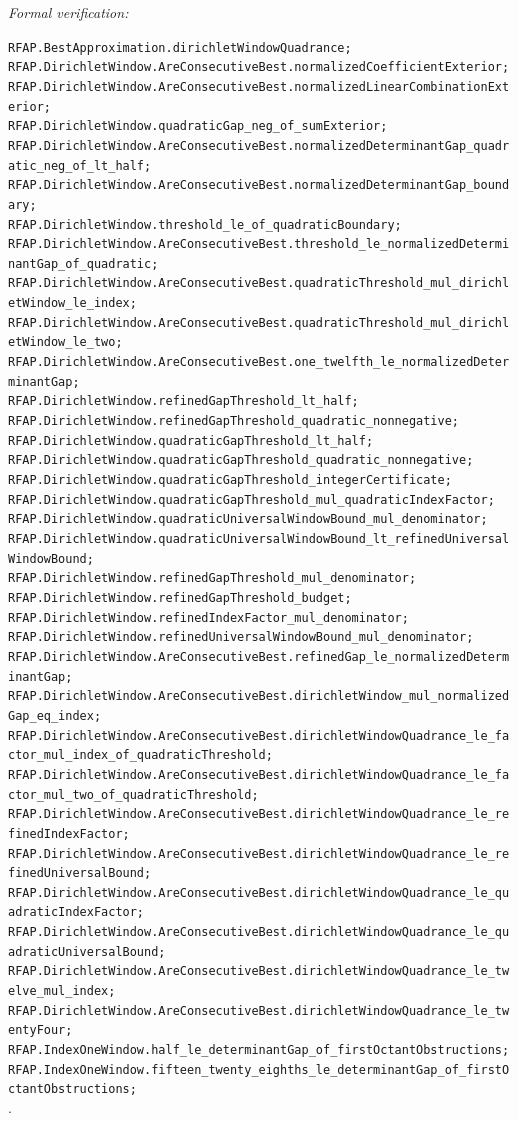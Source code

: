 \documentclass[11pt]{article}
\newcommand{\leanref}[1]{\par\smallskip\noindent
  \emph{Formal verification:}\par\nobreak
  {\raggedright\nolinkurl{#1}.\par}}
\begin{document}
\leanref{RFAP.BestApproximation.dirichletWindowQuadrance;
RFAP.DirichletWindow.AreConsecutiveBest.normalizedCoefficientExterior;
RFAP.DirichletWindow.AreConsecutiveBest.normalizedLinearCombinationExterior;
RFAP.DirichletWindow.quadraticGap_neg_of_sumExterior;
RFAP.DirichletWindow.AreConsecutiveBest.normalizedDeterminantGap_quadratic_neg_of_lt_half;
RFAP.DirichletWindow.AreConsecutiveBest.normalizedDeterminantGap_boundary;
RFAP.DirichletWindow.threshold_le_of_quadraticBoundary;
RFAP.DirichletWindow.AreConsecutiveBest.threshold_le_normalizedDeterminantGap_of_quadratic;
RFAP.DirichletWindow.AreConsecutiveBest.quadraticThreshold_mul_dirichletWindow_le_index;
RFAP.DirichletWindow.AreConsecutiveBest.quadraticThreshold_mul_dirichletWindow_le_two;
RFAP.DirichletWindow.AreConsecutiveBest.one_twelfth_le_normalizedDeterminantGap;
RFAP.DirichletWindow.refinedGapThreshold_lt_half;
RFAP.DirichletWindow.refinedGapThreshold_quadratic_nonnegative;
RFAP.DirichletWindow.quadraticGapThreshold_lt_half;
RFAP.DirichletWindow.quadraticGapThreshold_quadratic_nonnegative;
RFAP.DirichletWindow.quadraticGapThreshold_integerCertificate;
RFAP.DirichletWindow.quadraticGapThreshold_mul_quadraticIndexFactor;
RFAP.DirichletWindow.quadraticUniversalWindowBound_mul_denominator;
RFAP.DirichletWindow.quadraticUniversalWindowBound_lt_refinedUniversalWindowBound;
RFAP.DirichletWindow.refinedGapThreshold_mul_denominator;
RFAP.DirichletWindow.refinedGapThreshold_budget;
RFAP.DirichletWindow.refinedIndexFactor_mul_denominator;
RFAP.DirichletWindow.refinedUniversalWindowBound_mul_denominator;
RFAP.DirichletWindow.AreConsecutiveBest.refinedGap_le_normalizedDeterminantGap;
RFAP.DirichletWindow.AreConsecutiveBest.dirichletWindow_mul_normalizedGap_eq_index;
RFAP.DirichletWindow.AreConsecutiveBest.dirichletWindowQuadrance_le_factor_mul_index_of_quadraticThreshold;
RFAP.DirichletWindow.AreConsecutiveBest.dirichletWindowQuadrance_le_factor_mul_two_of_quadraticThreshold;
RFAP.DirichletWindow.AreConsecutiveBest.dirichletWindowQuadrance_le_refinedIndexFactor;
RFAP.DirichletWindow.AreConsecutiveBest.dirichletWindowQuadrance_le_refinedUniversalBound;
RFAP.DirichletWindow.AreConsecutiveBest.dirichletWindowQuadrance_le_quadraticIndexFactor;
RFAP.DirichletWindow.AreConsecutiveBest.dirichletWindowQuadrance_le_quadraticUniversalBound;
RFAP.DirichletWindow.AreConsecutiveBest.dirichletWindowQuadrance_le_twelve_mul_index;
RFAP.DirichletWindow.AreConsecutiveBest.dirichletWindowQuadrance_le_twentyFour;
RFAP.IndexOneWindow.half_le_determinantGap_of_firstOctantObstructions;
RFAP.IndexOneWindow.fifteen_twenty_eighths_le_determinantGap_of_firstOctantObstructions;
}
\end{document}
